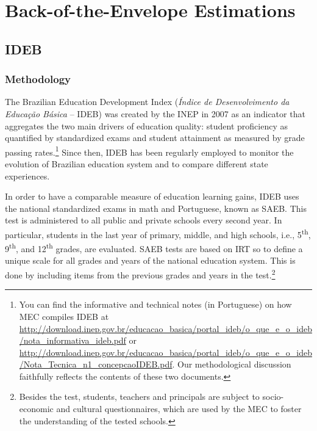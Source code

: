 \documentclass[11pt,a4paper]{article}
\begin{document}

\clearpage
\section{Back-of-the-Envelope Estimations} 
\setcounter{table}{0}
\setcounter{figure}{0}
\setcounter{equation}{0}
\renewcommand{\thetable}{B\arabic{table}}
\renewcommand{\thefigure}{B\arabic{figure}}
\renewcommand{\theequation}{B\arabic{equation}}

\subsection{IDEB} \label{sec:ideb}

\subsubsection*{Methodology}
The Brazilian Education Development Index (\textit{Índice de Desenvolvimento da Educação Básica} -- IDEB) was created by the INEP in 2007 as an indicator that aggregates the two main drivers of education quality: student proficiency as quantified by standardized exams and student attainment as measured by grade passing rates.\footnote{You can find the informative and technical notes (in Portuguese) on how MEC compiles IDEB at \href{http://download.inep.gov.br/educacao_basica/portal_ideb/o_que_e_o_ideb/nota_informativa_ideb.pdf}{http://download.inep.gov.br/educacao\_basica/portal\_ideb/o\_que\_e\_o\_ideb/nota\_informativa\_ideb.pdf} or \href{http://download.inep.gov.br/educacao_basica/portal_ideb/o_que_e_o_ideb/Nota_Tecnica_n1_concepcaoIDEB.pdf}{http://download.inep.gov.br/educacao\_basica/portal\_ideb/o\_que\_e\_o\_ideb/Nota\_Tecnica\_n1\_concepcaoIDEB.pdf}. Our methodological discussion faithfully reflects the contents of these two documents.} Since then, IDEB has been regularly employed to monitor the evolution of Brazilian education system and to compare different state experiences.

In order to have a comparable measure of education learning gains, IDEB uses the national standardized exams in math and Portuguese, known as SAEB. This test is administered to all public and private schools every second year. In particular, students in the last year of primary, middle, and high schools, i.e., 5\textsuperscript{th}, 9\textsuperscript{th}, and 12\textsuperscript{th} grades, are evaluated. SAEB tests are based on IRT so to define a unique scale for all grades and years of the national education system. This is done by including items from the previous grades and years in the test.\footnote{Besides the test, students, teachers and principals are subject to socio-economic and cultural questionnaires, which are used by the MEC to foster the understanding of the tested schools.}
\end{document}
